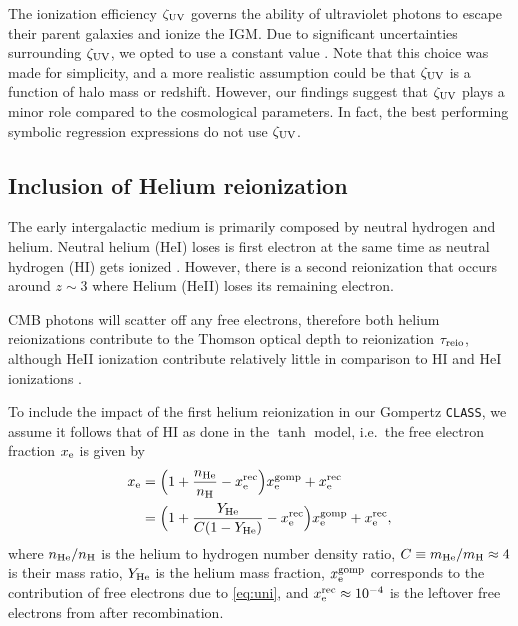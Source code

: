 The ionization efficiency $\zeta_\mathrm{UV}$ governs the ability of ultraviolet
photons to escape their parent galaxies and ionize the IGM.
Due to significant uncertainties surrounding $\zeta_\mathrm{UV}$, we opted to use
a constant value .
Note that this choice was made for simplicity, and a more realistic
assumption could be that $\zeta_\mathrm{UV}$ is a function of halo mass
\cite{Park2019} or redshift.
However, our findings suggest that $\zeta_\mathrm{UV}$ plays a minor role compared
to the cosmological parameters.
In fact, the best performing symbolic regression expressions do not use
$\zeta_\mathrm{UV}$.



\subsection*{Inclusion of Helium reionization}
\label{ssec:helium}

The early intergalactic medium is primarily composed by neutral hydrogen
and helium.
Neutral helium (HeI) loses is first electron at the same time as neutral
hydrogen (HI) gets ionized \cite{Trac2007}.
However, there is a second reionization that occurs around $z\sim3$
where Helium (HeII) loses its remaining electron.

CMB photons will scatter off any free electrons, therefore both helium
reionizations contribute to the Thomson optical depth to reionization
$\tau_{\mathrm{reio}}$, although HeII ionization contribute relatively little in
comparison to HI and HeI ionizations \cite{Liu2016}.

To include the impact of the first helium reionization in our Gompertz
\texttt{CLASS}, we assume it follows that of HI as done in the $\tanh$
model, i.e.\ the free electron fraction $x_{\mathrm{e}}$ is given by
%
\begin{align}
\label{eq:xe_H_He}
x_\e
&= \Bigl(1 + \frac{n_\He}{n_\mathrm{H}} - x^\rec_\e\Bigr) x_\e^\gomp
  + x^\rec_\e
\nonumber\\
%
&= \Bigl(1 + \frac{Y_\He}{C (1 - Y_\He)} - x^\rec_\e\Bigr) x_\e^\gomp
  + x^\rec_\e,
\end{align}
%
where $n_{\mathrm{He}} / n_\mathrm{H}$ is the helium to hydrogen number density
ratio, $C \equiv m_{\mathrm{He}} / m_\mathrm{H} \approx 4$ is their mass ratio,
$Y_{\mathrm{He}}$ is the helium mass fraction, $x_{\mathrm{e}}^{\mathrm{gomp}}$ corresponds to the
contribution of free electrons due to \cref{eq:uni}, and $x^{\mathrm{rec}}_{\mathrm{e}}
\approx 10^{-4}$ is the leftover free electrons from after
recombination.

